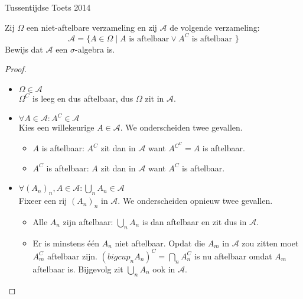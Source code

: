\documentclass[main.tex]{subfiles}
\begin{document}
\begin{examenvraag}{Tussentijdse Toets 2014}
  \begin{ex-vraag}
  Zij $\Omega$ een niet-aftelbare verzameling en zij $\mathcal{A}$ de volgende verzameling:
  \[ \mathcal{A} = \{ A \in \Omega \mid A \text{ is aftelbaar} \vee A^{C} \text{ is aftelbaar } \} \]
  Bewijs dat $\mathcal{A}$ een $\sigma$-algebra is.
  \end{ex-vraag}
  \begin{ex-antwoord}
    \begin{proof}
      \begin{itemize}
      \item $\Omega \in \mathcal{A}$\\
        $\Omega^{C}$ is leeg en dus aftelbaar, dus $\Omega$ zit in $\mathcal{A}$.
      \item $\forall A \in \mathcal{A}: A^{C}\in \mathcal{A}$\\
        Kies een willekeurige $A \in \mathcal{A}$. 
        We onderscheiden twee gevallen.
        \begin{itemize}
        \item $A$ is aftelbaar: $A^{C}$ zit dan in $\mathcal{A}$ want $A^{C^{C}} = A$ is aftelbaar.
        \item $A^{C}$ is aftelbaar: $A$ zit dan in $\mathcal{A}$ want $A^{C}$ is aftelbaar.
        \end{itemize}
      \item $\forall (A_{n})_{n}, A\in \mathcal{A}: \bigcup_{n} A_{n} \in \mathcal{A}$\\
        Fixeer een rij $(A_{n})_{n}$ in $\mathcal{A}$.
        We onderscheiden opnieuw twee gevallen.
        \begin{itemize}
        \item Alle $A_{n}$ zijn aftelbaar: $\bigcup_{n}A_{n}$ is dan aftelbaar en zit dus in $\mathcal{A}$.
        \item Er is minstens \'e\'en $A_{n}$ niet aftelbaar. Opdat die $A_{m}$ in $\mathcal{A}$ zou zitten moet $A_{m}^{C}$ aftelbaar zijn.
          $\left(bigcup_{n}A_{n}\right)^{C} = \bigcap_{n}A_{n}^{C}$ is nu aftelbaar omdat $A_{m}$ aftelbaar is.
          Bijgevolg zit $\bigcup_{n}A_{n}$ ook in $\mathcal{A}$.
        \end{itemize}
      \end{itemize}
    \end{proof}
  \end{ex-antwoord}
\end{examenvraag}
\end{document}
